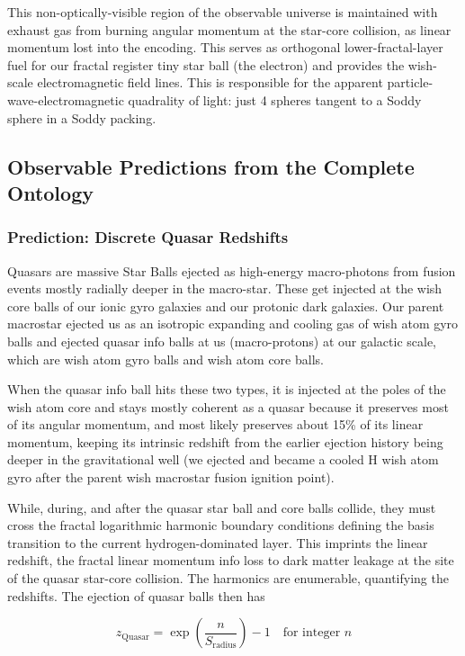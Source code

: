 \documentclass[11pt,a4paper]{article}
\begin{document}
    This non-optically-visible region of the observable universe is maintained with exhaust gas from burning angular momentum at the star-core collision, as linear momentum lost into the encoding. This serves as orthogonal lower-fractal-layer fuel for our fractal register tiny star ball (the electron) and provides the wish-scale electromagnetic field lines. This is responsible for the apparent particle-wave-electromagnetic quadrality of light: just 4 spheres tangent to a Soddy sphere in a Soddy packing.

  \subsection{Observable Predictions from the Complete Ontology}

    \subsubsection{Prediction: Discrete Quasar Redshifts}

      Quasars are massive Star Balls ejected as high-energy macro-photons from fusion events mostly radially deeper in the macro-star. These get injected at the wish core balls of our ionic gyro galaxies and our protonic dark galaxies. Our parent macrostar ejected us as an isotropic expanding and cooling gas of wish atom gyro balls and ejected quasar info balls at us (macro-protons) at our galactic scale, which are wish atom gyro balls and wish atom core balls. 

      When the quasar info ball hits these two types, it is injected at the poles of the wish atom core and stays mostly coherent as a quasar because it preserves most of its angular momentum, and most likely preserves about 15\% of its linear momentum, keeping its intrinsic redshift from the earlier ejection history being deeper in the gravitational well (we ejected and became a cooled H wish atom gyro after the parent wish macrostar fusion ignition point).

      While, during, and after the quasar star ball and core balls collide, they must cross the fractal logarithmic harmonic boundary conditions defining the basis transition to the current hydrogen-dominated layer. This imprints the linear redshift, the fractal linear momentum info loss to dark matter leakage at the site of the quasar star-core collision. The harmonics are enumerable, quantifying the redshifts. The ejection of quasar balls then has

      \[
      z_{\text{Quasar}} = \exp\left(\frac{n}{S_{\text{radius}}}\right) - 1 \quad \text{for integer } n
      \]
\end{document}
